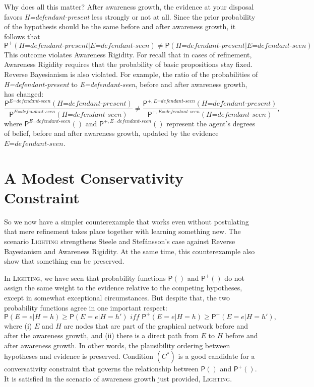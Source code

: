 \documentclass[
  11pt,
  dvipsnames,enabledeprecatedfontcommands]{scrartcl}
\newcommand{\pr}[1]{\ensuremath{\mathsf{P}(#1)}}
\newcommand{\ppr}[2]{\ensuremath{\mathsf{P}^{#1}(#2)}}
\begin{document}
Why does all this matter? After awareness growth, the evidence at your
disposal favors \textit{H=defendant-present} less strongly or not at
all. Since the prior probability of the hypothesis should be the same
before and after awareness growth, it follows that
\[\ppr{+}{\textit{H=defendant-present} \vert \textit{E=defendant-seen}} \neq \pr{\textit{H=defendant-present} \vert \textit{E=defendant-seen}}\]
This outcome violates Awareness Rigidity. For recall that in cases of
refinement, Awareness Rigidity requires that the probability of basic
propositions stay fixed. Reverse Bayesianism is also violated. For
example, the ratio of the probabilities of \textit{H=defendant-present}
to \textit{E=defendant-seen}, before and after awareness growth, has
changed:
\[\frac{\ppr{\textit{E=defendant-seen}}{\textit{H=defendant-present}}}{\ppr{ \textit{E=defendant-seen}}{\textit{H=defendant-seen}}} \neq \frac{\ppr{+, \textit{E=defendant-seen}}{\textit{H=defendant-present}}}{\ppr{+, \textit{E=defendant-seen}}{\textit{H=defendant-seen}}},\]
where \(\ppr{\textit{E=defendant-seen}}{}\) and
\(\ppr{+, \textit{E=defendant-seen}}{}\) represent the agent's degrees
of belief, before and after awareness growth, updated by the evidence
\(\textit{E=defendant-seen}\).

\hypertarget{a-modest-conservativity-constraint}{%
\section{A Modest Conservativity
Constraint}\label{a-modest-conservativity-constraint}}

So we now have a simpler counterexample that works even without
postulating that mere refinement takes place together with learning
something new. The scenario \textsc{Lighting} strengthens Steele and
Stefánsson's case against Reverse Bayesianism and Awareness Rigidity. At
the same time, this counterexample also show that something can be
preserved.

In \textsc{Lighting}, we have seen that probability functions \(\pr{}\)
and \(\ppr{+}{}\) do not assign the same weight to the evidence relative
to the competing hypotheses, except in somewhat exceptional
circumstances. But despite that, the two probability functions agree in
one important respect:
\[\pr{E=e \vert H=h} \geq \pr{E=e \vert H=h'} \textit{ iff } \ppr{+}{E=e \vert H=h} \geq \ppr{+}{E=e \vert H=h'} \tag{$C^*$},\]
where (i) \(E\) and \(H\) are nodes that are part of the graphical
network before and after the awareness growth, and (ii) there is a
direct path from \(E\) to \(H\) before and after awareness
growth. In other words,
the plausibility ordering between hypotheses and evidence is preserved.
Condition \((C^*)\) is a good candidate for a conversativity constraint
that governs the relationship between \(\pr{}\) and \(\ppr{+}{}\). It is
satisfied in the scenario of awareness growth just provided,
\textsc{Lighting}.
\end{document}

